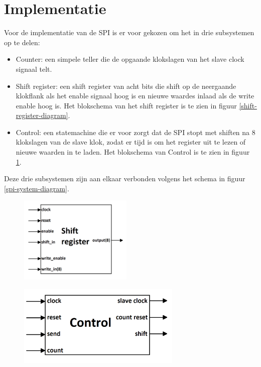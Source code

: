 \documentclass[oneside,dutch]{tudelft-report}
\begin{document}
\section{Implementatie}
Voor de implementatie van de SPI is er voor gekozen om het in drie subsystemen op te delen:
\begin{itemize}
\item Counter: een simpele teller die de opgaande klokslagen van het slave clock signaal telt. 
\item Shift register: een shift register van acht bits die shift op de neergaande klokflank als het enable signaal hoog is en nieuwe waardes inlaad als de write enable hoog is. Het blokschema van het shift register is te zien in figuur \ref{shift-register-diagram}.
\item Control: een statemachine die er voor zorgt dat de SPI stopt met shiften na 8 klokslagen van de slave klok, zodat er tijd is om het register uit te lezen of nieuwe waarden in te laden. Het blokschema van Control is te zien in figuur \ref{control-diagram}.
\end{itemize}

Deze drie subsystemen zijn aan elkaar verbonden volgens het schema in figuur \ref{spi-system-diagram}.

\begin{figure}[H]
\centering
\begin{minipage}{.5\textwidth}
  \centering
  \includegraphics[width=5.4cm]{./shift_register_diagram}
  \label{shift-register-diagram}
\end{minipage}%
\begin{minipage}{.5\textwidth}
  \centering
  \includegraphics[width=7.8cm]{./control_diagram}
  \label{control-diagram}
\end{minipage}
\end{figure}
\end{document}
